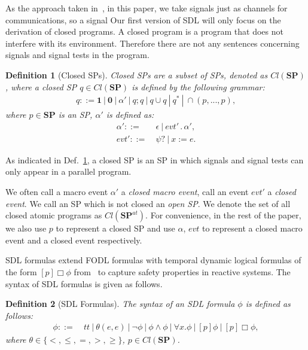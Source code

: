 \documentclass{fcs}
\newtheorem{mydef}{Definition}[section]
\newcommand{\act}[0]{\mathit{evt}}
\newcommand{\noth}[0]{\mathbf{1}}
\newcommand{\halt}[0]{\mathbf{0}}
\newcommand{\true}[0]{\mathit{tt}}
\newcommand{\SP}[0]{\mathbf{SP}}
\newcommand{\Cl}[0]{\mathit{Cl}}
\DeclareMathOperator{\seq}{;}
\DeclareMathOperator{\cho}{\cup}
\DeclareMathOperator{\para}{\cap}
\newcommand{\ASP}[0]{\SP^{\mathit{at}}}
\DeclareMathOperator{\nex}{.}
\newcommand{\ddef}[0]{::=}
\begin{document}
As the approach taken in~\cite{concurrent dynamic logic}, in this paper, we take signals just as channels for communications, so a signal
\fi
\ifx
Our first version of SDL will only focus on the derivation of closed programs.
A closed program is a program that does not interfere with its environment.
Therefore there are not any sentences concerning signals and signal tests in the program.
\fi
\begin{mydef}[Closed SPs]
\label{def:Closed SPs}
	Closed SPs are a subset of SPs, denoted as $\Cl(\SP)$, where
	a closed SP $q\in \Cl(\SP)$ is defined by the following grammar:
	$$\begin{aligned}
	q\ddef \noth\ |\ \halt\ |\ \alpha'\ |\ q\seq q\ |\ q\cho q\ |\ q^*\ |\ \para(p,...,p),
	\end{aligned}$$
where $p\in \SP$ is an SP, $\alpha'$ is defined as:
	$$\begin{aligned}
\alpha' \ddef&\ \epsilon\ |\ \act'\nex \alpha',\\
\act' \ddef &\ \psi?\ |\ x:=e.
\end{aligned}$$
\end{mydef}

As indicated in Def.~\ref{def:Closed SPs}, a closed SP is an SP in which signals and signal tests can only appear in a parallel program.

We often call a macro event $\alpha'$ a \emph{closed macro event}, call an event $\act'$ a \emph{closed event}.
We call an SP which is not closed an \emph{open SP}.
We denote the set of all closed atomic programs as $\Cl(\ASP)$.
For convenience, in the rest of the paper, we also use $p$ to represent a closed SP and use $\alpha$, $\act$ to represent a closed macro event and a closed event respectively.

SDL formulas extend FODL formulas with temporal dynamic logical formulas of the form $[p]\Box\phi$ from~\cite{Platzer07} to capture safety properties in reactive systems.
The syntax of SDL formulas is given as follows.


\begin{mydef}[SDL Formulas]
    \label{def:sDTL Formulas}
	The syntax of an SDL formula $\phi$ is defined as follows:
$$\begin{aligned}
	\phi \ddef &\ \true\ |\ \theta(e,e)\ |\ \neg \phi\ |\ \phi\wedge \phi\ |\ \forall x.\phi\ |\ [p]\phi\ |\ [p]\Box\phi,
\end{aligned}$$
where $\theta\in \{<, \le, =, >, \ge\}$, $p\in \Cl(\SP)$.
\end{mydef}
\end{document}
